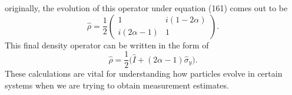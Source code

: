 \documentclass[twocolumn]{article}
\begin{document}
originally, the evolution of this operator under equation (161) comes out to be
\begin{equation}
\hat{\rho}=\frac{1}{2}
\begin{pmatrix}
1 & i(1-2\alpha) \\
i(2\alpha-1) & 1
\end{pmatrix}.
\end{equation}
This final density operator can be written in the form of 
\begin{equation}
\hat{\rho}=\frac{1}{2}\big(\hat{I}+(2\alpha-1)\hat{\sigma}_y\big).
\end{equation}
These calculations are vital for understanding how particles evolve in certain systems when we are trying to obtain measurement estimates. 
\end{document}
